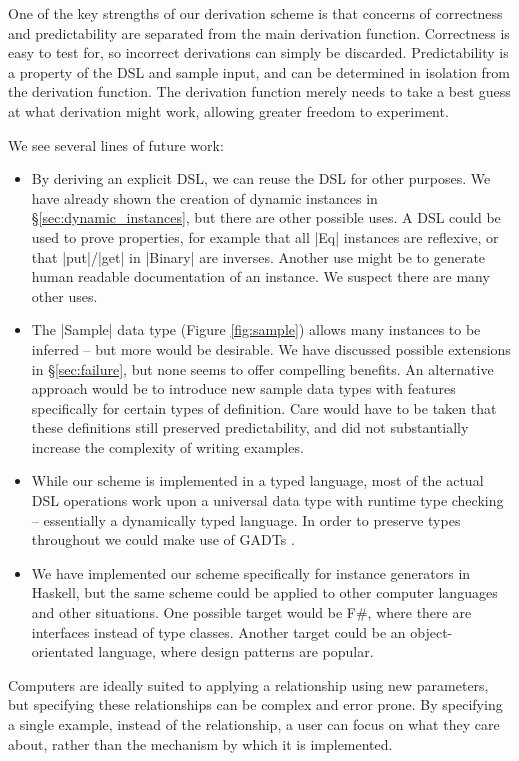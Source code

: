\documentclass{llncs}
\begin{document}
One of the key strengths of our derivation scheme is that concerns of correctness and predictability are separated from the main derivation function. Correctness is easy to test for, so incorrect derivations can simply be discarded. Predictability is a property of the DSL and sample input, and can be determined in isolation from the derivation function. The derivation function merely needs to take a best guess at what derivation might work, allowing greater freedom to experiment.

We see several lines of future work:

\begin{itemize}
\item By deriving an explicit DSL, we can reuse the DSL for other purposes. We have already shown the creation of dynamic instances in \S\ref{sec:dynamic_instances}, but there are other possible uses. A DSL could be used to prove properties, for example that all |Eq| instances are reflexive, or that |put|/|get| in |Binary| are inverses. Another use might be to generate human readable documentation of an instance. We suspect there are many other uses.
\item The |Sample| data type (Figure \ref{fig:sample}) allows many instances to be inferred -- but more would be desirable. We have discussed possible extensions in \S\ref{sec:failure}, but none seems to offer compelling benefits. An alternative approach would be to introduce new sample data types with features specifically for certain types of definition. Care would have to be taken that these definitions still preserved predictability, and did not substantially increase the complexity of writing examples.
\item While our scheme is implemented in a typed language, most of the actual DSL operations work upon a universal data type with runtime type checking -- essentially a dynamically typed language. In order to preserve types throughout we could make use of GADTs \cite{spj:gadt}.
\item We have implemented our scheme specifically for instance generators in Haskell, but the same scheme could be applied to other computer languages and other situations. One possible target would be F\#, where there are interfaces instead of type classes. Another target could be an object-orientated language, where design patterns \cite{design_patterns} are popular.
\end{itemize}

Computers are ideally suited to applying a relationship using new parameters, but specifying these relationships can be complex and error prone. By specifying a single example, instead of the relationship, a user can focus on what they care about, rather than the mechanism by which it is implemented.
\end{document}
